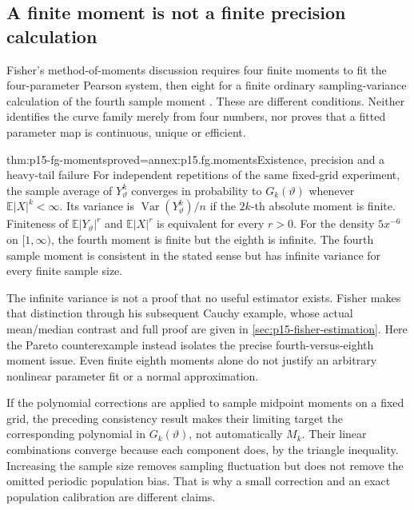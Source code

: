 \subsection{A finite moment is not a finite precision calculation}

Fisher's method-of-moments discussion requires four finite moments to fit
the four-parameter Pearson system, then eight for a finite ordinary
sampling-variance calculation of the fourth sample moment
\cite[p.~321]{Fisher1922Foundations}. These are different conditions.
Neither identifies the curve family merely from four numbers, nor proves
that a fitted parameter map is continuous, unique or efficient.

\begin{hbtheorem}{thm:p15-fg-moments}{proved=annex:p15.fg.moments}{Existence, precision and a heavy-tail failure}
For independent repetitions of the same fixed-grid experiment, the sample
average of \(Y_\vartheta^k\) converges in probability to
\(G_k(\vartheta)\) whenever \(\mathbb E|X|^k<\infty\). Its variance is
\(\operatorname{Var}(Y_\vartheta^k)/n\) if the \(2k\)-th absolute
moment is finite. Finiteness of \(\mathbb E|Y_\vartheta|^r\) and
\(\mathbb E|X|^r\) is equivalent for every \(r>0\).
For the density \(5x^{-6}\) on \([1,\infty)\), the fourth moment is
finite but the eighth is infinite. The fourth sample moment is consistent
in the stated sense but has infinite variance for every finite sample size.
\end{hbtheorem}

The infinite variance is not a proof that no useful estimator exists.
Fisher makes that distinction through his subsequent Cauchy example,
whose actual mean/median contrast and full proof are given in
\cref{sec:p15-fisher-estimation}. Here the Pareto counterexample instead
isolates the precise fourth-versus-eighth moment issue. Even finite
eighth moments alone do not justify an arbitrary nonlinear parameter fit
or a normal approximation.

If the polynomial corrections are applied to sample midpoint moments on
a fixed grid, the preceding consistency result makes their limiting
target the corresponding polynomial in \(G_k(\vartheta)\), not automatically
\(M_k\). Their linear combinations converge because each component
does, by the triangle inequality. Increasing the sample size removes
sampling fluctuation but does not remove the omitted periodic population
bias. That is why a small correction and an exact population calibration
are different claims.

